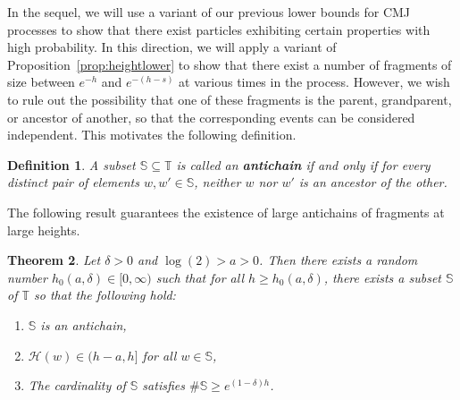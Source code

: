 \documentclass[a4,12pt]{amsart}
\numberwithin{equation}{section}
\newtheorem{thm}{Theorem}[section]
\newtheorem{df}[thm]{Definition}
\begin{document}
	In the sequel, we will use a variant of our previous lower bounds for CMJ processes 
	to show that there exist particles exhibiting certain properties with high probability.
	In this direction, we will apply a variant of Proposition~\ref{prop:heightlower} 
	to show that there exist a number of fragments of size between $e^{-h}$ and $e^{-(h - s)}$ 
	at various times in the process.
	However, we wish to rule out the possibility that one of these fragments is the parent, grandparent, 
	or ancestor of another, so that the corresponding events can be considered independent. 
	This motivates the following definition.

	\begin{df}
		A subset $\mathbb{S} \subseteq \mathbb{T}$ is called an \textbf{antichain} if and only if for every distinct pair of elements $w, w' \in \mathbb{S}$, 
neither $w$ nor $w'$ is an ancestor of the other. 
	\end{df}

	The following result guarantees the existence of large antichains of fragments at large heights.

	\begin{thm} \label{thm:antichains}
		Let $\delta > 0 $ and  $ \log(2) > a > 0$. 
		Then there exists a random number $h_0(a,\delta)\in[0,\infty)$ such that for all $h \geq h_0(a,\delta)$, 
		there exists a subset $\mathbb{S}$ of $\mathbb{T}$ so that the following hold:
		\begin{enumerate}
			\item $\mathbb{S}$ is an antichain,
			\item $\mathcal{H}(w) \in (h-a,h]$ for all $w \in \mathbb{S}$,
			\item The cardinality of $\mathbb{S}$ satisfies $\# \mathbb{S} \geq e^{ (1 - \delta)h}$.
		\end{enumerate}
	\end{thm}
\end{document}
